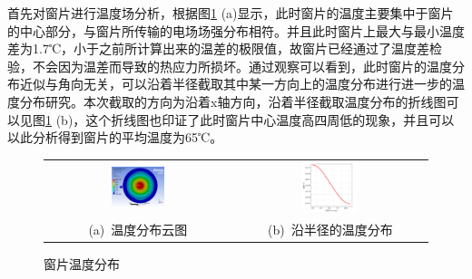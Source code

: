 \documentclass[master]{thesis-uestc}
\begin{document}
首先对窗片进行温度场分析，根据图\ref{fig:X输入温度场} (a)显示，此时窗片的温度主要集中于窗片的中心部分，与窗片所传输的电场场强分布相符。并且此时窗片上最大与最小温度差为1.7℃，小于之前所计算出来的温差的极限值，故窗片已经通过了温度差检验，不会因为温差而导致的热应力所损坏。通过观察可以看到，此时窗片的温度分布近似与角向无关，可以沿着半径截取其中某一方向上的温度分布进行进一步的温度分布研究。本次截取的方向为沿着x轴方向，沿着半径截取温度分布的折线图可以见图\ref{fig:X输入温度场} (b)，这个折线图也印证了此时窗片中心温度高四周低的现象，并且可以以此分析得到窗片的平均温度为65℃。
\begin{figure}[!htb]
    \small
    \centering
    \begin{tabular}{@{\ }c@{\ }c}
        \includegraphics[width=0.3\textwidth]{pic/chapter3/X频段温度分布.png} & 
        \hspace{5pt}
        \includegraphics[width=0.3\textwidth]{pic/chapter3/窗片温度沿半径分布.png}     \\
        \mbox{\small (a) 温度分布云图}                                                                               & 
        \mbox{\small (b) 沿半径的温度分布}                                                                                  \\
    \end{tabular}
    \caption{窗片温度分布}
    \label{fig:X输入温度场}
\end{figure}
\end{document}
